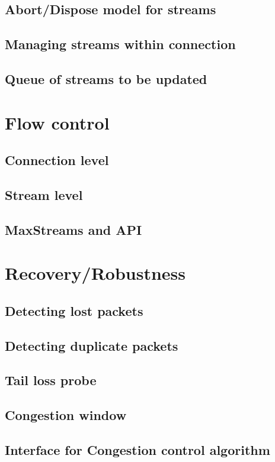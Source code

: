 \subsection{Abort/Dispose model for streams}
\subsection{Managing streams within connection}
\subsection{Queue of streams to be updated}


\section{Flow control}

\subsection{Connection level}
\subsection{Stream level}
\subsection{MaxStreams and API}


\section{Recovery/Robustness}

\subsection{Detecting lost packets}
\subsection{Detecting duplicate packets}
\subsection{Tail loss probe}
\subsection{Congestion window}
\subsection{Interface for Congestion control algorithm}
